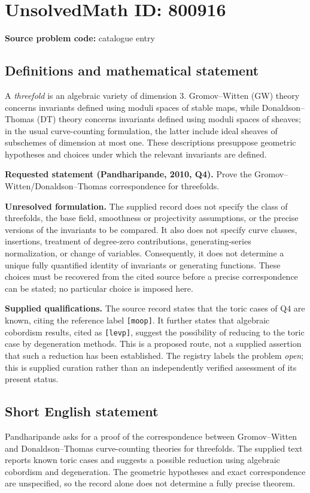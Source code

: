 \documentclass[11pt]{article}
\begin{document}
\section*{UnsolvedMath ID: 800916}
\textbf{Source problem code:} catalogue entry
\subsection{Definitions and mathematical statement}
A \emph{threefold} is an algebraic variety of dimension \(3\). Gromov--Witten (GW) theory concerns invariants defined using moduli spaces of stable maps, while Donaldson--Thomas (DT) theory concerns invariants defined using moduli spaces of sheaves; in the usual curve-counting formulation, the latter include ideal sheaves of subschemes of dimension at most one. These descriptions presuppose geometric hypotheses and choices under which the relevant invariants are defined.

\textbf{Requested statement (Pandharipande, 2010, Q4).} Prove the Gromov--Witten/Donaldson--Thomas correspondence for threefolds.

\textbf{Unresolved formulation.} The supplied record does not specify the class of threefolds, the base field, smoothness or projectivity assumptions, or the precise versions of the invariants to be compared. It also does not specify curve classes, insertions, treatment of degree-zero contributions, generating-series normalization, or change of variables. Consequently, it does not determine a unique fully quantified identity of invariants or generating functions. These choices must be recovered from the cited source before a precise correspondence can be stated; no particular choice is imposed here.

\textbf{Supplied qualifications.} The source record states that the toric cases of Q4 are known, citing the reference label \texttt{[moop]}. It further states that algebraic cobordism results, cited as \texttt{[levp]}, suggest the possibility of reducing to the toric case by degeneration methods. This is a proposed route, not a supplied assertion that such a reduction has been established. The registry labels the problem \emph{open}; this is supplied curation rather than an independently verified assessment of its present status.
\subsection{Short English statement}
Pandharipande asks for a proof of the correspondence between Gromov--Witten and Donaldson--Thomas curve-counting theories for threefolds. The supplied text reports known toric cases and suggests a possible reduction using algebraic cobordism and degeneration. The geometric hypotheses and exact correspondence are unspecified, so the record alone does not determine a fully precise theorem.
\end{document}
